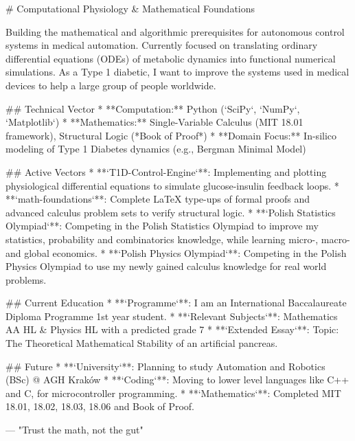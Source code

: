 # Computational Physiology & Mathematical Foundations

Building the mathematical and algorithmic prerequisites for autonomous control systems in medical automation. Currently focused on translating ordinary differential equations (ODEs) of metabolic dynamics into functional numerical simulations. As a Type 1 diabetic, I want to improve the systems used in medical devices to help a large group of people worldwide.

## Technical Vector
* **Computation:** Python (`SciPy`, `NumPy`, `Matplotlib`)
* **Mathematics:** Single-Variable Calculus (MIT 18.01 framework), Structural Logic (*Book of Proof*)
* **Domain Focus:** In-silico modeling of Type 1 Diabetes dynamics (e.g., Bergman Minimal Model)

## Active Vectors
* **`T1D-Control-Engine`**: Implementing and plotting physiological differential equations to simulate glucose-insulin feedback loops.
* **`math-foundations`**: Complete LaTeX type-ups of formal proofs and advanced calculus problem sets to verify structural logic.
* **`Polish Statistics Olympiad`**: Competing in the Polish Statistics Olympiad to improve my statistics, probability and combinatorics knowledge, while learning micro-, macro- and global economics.
* **`Polish Physics Olympiad`**: Competing in the Polish Physics Olympiad to use my newly gained calculus knowledge for real world problems.

## Current Education
* **`Programme`**: I am an International Baccalaureate Diploma Programme 1st year student. 
* **`Relevant Subjects`**: Mathematics AA HL & Physics HL with a predicted grade 7
* **`Extended Essay`**: Topic: The Theoretical Mathematical Stability of an artificial pancreas.

## Future
* **`University`**: Planning to study Automation and Robotics (BSc) @ AGH Kraków 
* **`Coding`**: Moving to lower level languages like C++ and C, for microcontroller programming. 
* **`Mathematics`**: Completed MIT 18.01, 18.02, 18.03, 18.06 and Book of Proof.

---
"Trust the math, not the gut"
